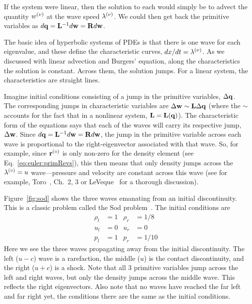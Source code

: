 If the system were linear, then the solution to each would simply be
to advect the quantity $w^{(\nu)}$ at the wave speed $\lambda^{(\nu)}$.  We
could then get back the primitive variables as $d{\bf q} = {\bf L}^{-1} d{\bf w} = {\bf R} d{\bf w}$.

The basic idea of hyperbolic systems of PDEs is that there is one wave
for each eigenvalue, and these define the characteristic curves,
$dx/dt = \lambda^{(\nu)}$.  As we discussed with linear advection
and Burgers' equation, along the characteristics the solution is
constant.  Across them, the solution jumps.  For a linear system, the
characteristics are straight lines.

Imagine initial conditions consisting of a jump in the primitive
variables, $\Delta {\bf q}$.  The corresponding jumps in characteristic
variables are $\Delta {\bf w} \sim {\bf L} \Delta {\bf q}$ (where the $\sim$ accounts
for the fact that in a nonlinear system, ${\bf L} = {\bf L}({\bf q})$).  The
characteristic form of the equations says that each of the waves will
carry its respective jump, $\Delta {\bf w}$.  Since $d{\bf q} = {\bf L}^{-1}d{\bf w} = {\bf R} d{\bf w}$,
the jump in the primitive variable across each wave is proportional to
the right-eigenvector associated with that wave.  So, for example,
since ${\bf r}^{(\circ)}$ is only non-zero for the density element (see
Eq.~\ref{eq:euler:primRevs}), this then means that only density jumps
across the $\lambda^{(\circ)} = u$ wave---pressure and velocity are
constant across this wave (see for example, Toro~\cite{toro:1997},
Ch.\ 2, 3 or LeVeque~\cite{leveque:2002} for a thorough discussion).

Figure~\ref{fig:sod} shows the three waves emanating from an initial
discontinuity.  This is a classic problem called the Sod
problem~\cite{sod:1978}.  The initial conditions are
\begin{align}
\rho_l &= 1      &  \rho_r &= 1/8 \nonumber \\
u_l   &= 0       &  u_r    &= 0   \\
p_l    &= 1      &  p_r    &= 1/10 \nonumber
\end{align}
Here we see the three waves propagating away from the initial
discontinuity.  The left ($u-c$) wave is a rarefaction, the middle
($u$) is the contact discontinuity, and the right ($u+c$) is a
shock. Note that all 3 primitive variables jump across the left and
right waves, but only the density jumps across the middle wave.  This
reflects the right eigenvectors.  Also note that no waves have reached
the far left and far right yet, the conditions there are the same as
the initial conditions.  


